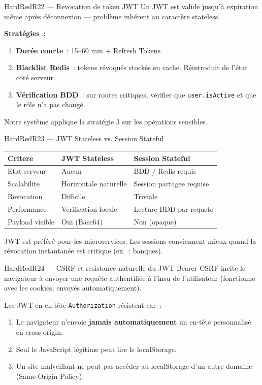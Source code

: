 \documentclass[12pt,a4paper,oneside]{report}
\begin{document}
\begin{qbox}{HardRed}{R22 --- Revocation de token JWT}
Un JWT est valide jusqu'à expiration même après déconnexion --- problème
inhérent au caractère stateless.

\textbf{Stratégies~:}
\begin{enumerate}
  \item \textbf{Durée courte}~: 15--60 min + Refresh Tokens.
  \item \textbf{Blacklist Redis}~: tokens révoqués stockés en cache.
        Réintroduit de l'état côté serveur.
  \item \textbf{Vérification BDD}~: sur routes critiques, vérifier que
        \texttt{user.isActive} et que le rôle n'a pas changé.
\end{enumerate}
Notre système applique la stratégie 3 sur les opérations sensibles.
\end{qbox}

\begin{qbox}{HardRed}{R23 --- JWT Stateless vs. Session Stateful}
\begin{tabular}{@{}lll@{}}
\toprule
\textbf{Critere}   & \textbf{JWT Stateless} & \textbf{Session Stateful} \\
\midrule
Etat serveur       & Aucun                  & BDD / Redis requis        \\
Scalabilite        & Horizontale naturelle  & Session partagee requise  \\
Revocation         & Difficile              & Triviale                  \\
Performance        & Verification locale    & Lecture BDD par requete   \\
Payload visible    & Oui (Base64)           & Non (opaque)              \\
\bottomrule
\end{tabular}

\vspace{4pt}
JWT est préféré pour les microservices. Les sessions conviennent mieux
quand la révocation instantanée est critique (ex.~: banques).
\end{qbox}

\begin{qbox}{HardRed}{R24 --- CSRF et resistance naturelle du JWT Bearer}
CSRF incite le navigateur à envoyer une requête authentifiée à l'insu
de l'utilisateur (fonctionne avec les cookies, envoyés automatiquement).

Les JWT en en-tête \texttt{Authorization} résistent car~:
\begin{enumerate}
  \item Le navigateur n'envoie \textbf{jamais automatiquement} un
        en-tête personnalisé en cross-origin.
  \item Seul le JavaScript légitime peut lire le localStorage.
  \item Un site malveillant ne peut pas accéder au localStorage d'un
        autre domaine (Same-Origin Policy).
\end{enumerate}
\end{qbox}
\end{document}
